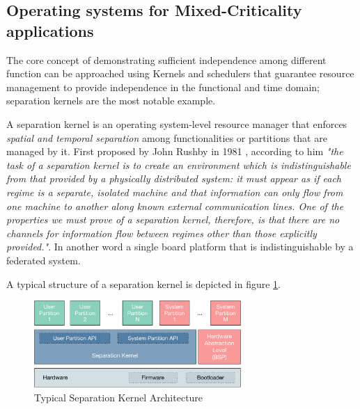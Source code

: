 \subsection{Operating systems for Mixed-Criticality applications}
The core concept of demonstrating sufficient independence among different function can be approached using Kernels and schedulers that guarantee resource management to provide independence in the functional and time domain; separation kernels are the most notable example.
\par A separation kernel is an operating system-level resource manager that enforces \emph{spatial and temporal separation} among functionalities or partitions that are managed by it. First proposed by John Rushby in 1981 \cite{separationkernel}, according to him \emph{"the task of a separation kernel is to create an environment which is indistinguishable from that provided by a physically distributed system: it must appear as if each regime is a separate, isolated machine and that information can only flow from one machine to another along known external communication lines. One of the properties we must prove of a separation kernel, therefore, is that there are no channels for information flow between regimes other than those explicitly provided."}. In another word a single board platform that is indistinguishable by a federated system. 
\par A typical structure of a separation kernel is depicted in figure \ref{fig:separationkernel}. 
\begin{figure}[htbp] 
\centering    
\includegraphics[width=0.7\textwidth]{SeparationKernel}
\caption{Typical Separation Kernel Architecture}
\label{fig:separationkernel}
\end{figure}

